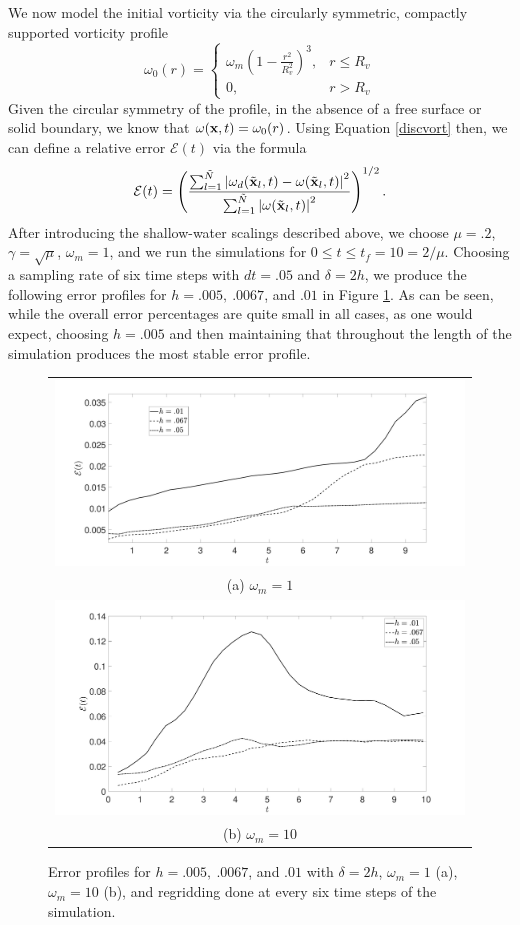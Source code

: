 \documentclass[a4paper,11pt]{article}
\newcommand{\ba}{\begin{array}}
\newcommand{\ea}{\end{array}}
\begin{document}
We now model the initial vorticity via the circularly symmetric, compactly supported vorticity profile
\[
\omega_{0}(r) =\left\{  \ba{rl}  \omega_{m}\left(1-\frac{r^{2}}{R_{v}^{2}}\right)^{3}, & r\leq R_{v} \\ 0, & r>R_{v} \ea\right.
\] 
Given the circular symmetry of the profile, in the absence of a free surface or solid boundary, we know that $\omega({\bf x},t) = \omega_{0}(r)$.  Using Equation \eqref{discvort} then, we can define a relative error $\mathcal{E}(t)$ via the formula 
\[
\mathcal{E}(t) = \left(\frac{\sum_{l=1}^{\tilde{N}}\left|\omega_{d}(\tilde{\bf x}_{l},t) - \omega(\tilde{\bf x}_{l},t) \right|^{2}}{\sum_{l=1}^{\tilde{N}}\left|\omega(\tilde{\bf x}_{l},t) \right|^{2}} \right)^{1/2}.
\]
After introducing the shallow-water scalings described above, we choose $\mu=.2$, $\gamma=\sqrt{\mu}$, $\omega_{m}=1$, and we run the simulations for $0\leq t \leq t_{f}=10 = 2/\mu$.  Choosing a sampling rate of six time steps with $dt=.05$ and $\delta = 2h$, we produce the following error profiles for $h=.005, ~ .0067$, and $.01$ in Figure \ref{fig:err_prof}.  As can be seen, while the overall error percentages are quite small in all cases, as one would expect, choosing $h=.005$ and then maintaining that throughout the length of the simulation produces the most stable error profile.  
\begin{figure}[!h]
\centering
\begin{tabular}{c}
\includegraphics[width=.85\textwidth]{full_error_comparison}\\
(a) $\omega_{m}=1$\\
\includegraphics[width=.85\textwidth]{full_error_comparison_wm_10}\\
(b) $\omega_{m}=10$
\end{tabular}
\caption{Error profiles for $h=.005, ~ .0067$, and $.01$ with $\delta=2h$, $\omega_{m}=1$ (a), $\omega_{m}=10$ (b), and regridding done at every six time steps of the simulation.}
\label{fig:err_prof}
\end{figure}
\end{document}
